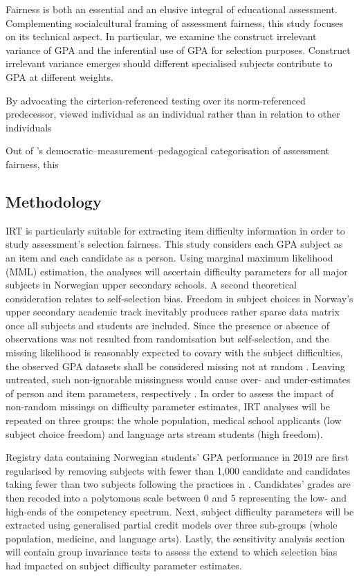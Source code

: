 Fairness is both an essential and an elusive integral of educational assessment. Complementing  socialcultural framing of assessment fairness, this study focuses on its technical aspect. In particular, we examine the construct irrelevant variance of GPA and the inferential use of GPA for selection purposes. Construct irrelevant variance \parencite{messick:1989} emerges should different specialised subjects contribute to GPA at different weights.

By advocating the cirterion-referenced testing over its norm-referenced predecessor, \textcite{glaser:1963} viewed individual as an individual rather than in relation to other individuals

Out of 's democratic--measurement--pedagogical categorisation of assessment fairness, this

\subsection{Methodology}

IRT is particularly suitable for extracting item difficulty information in order to study assessment's selection fairness. This study considers each GPA subject as an item and each candidate as a person. Using marginal maximum likelihood (MML) estimation, the analyses will ascertain difficulty parameters for all major subjects in Norwegian upper secondary schools. A second theoretical consideration relates to self-selection bias. Freedom in subject choices in Norway's upper secondary academic track inevitably produces rather sparse data matrix once all subjects and students are included. Since the presence or absence of observations was not resulted from randomisation but self-selection, and the missing likelihood is reasonably expected to covary with the subject difficulties, the observed GPA datasets shall be considered missing not at random \parencite[MNAR,][]{rubin:1976}. Leaving untreated, such non-ignorable missingness would cause over- and under-estimates of person and item parameters, respectively \parencite{rose:2013}. In order to assess the impact of non-random missings on difficulty parameter estimates, IRT analyses will be repeated on three groups: the whole population, medical school applicants (low subject choice freedom) and language arts stream students (high freedom).

Registry data containing Norwegian students' GPA performance in 2019 are first regularised by removing subjects with fewer than 1,000 candidate and candidates taking fewer than two subjects following the practices in \textcite{he:2018}. Candidates' grades are then recoded into a polytomous scale between $0$ and $5$ representing the low- and high-ends of the competency spectrum. Next, subject difficulty parameters will be extracted using generalised partial credit models \parencite[GPCM,][]{muraki:1992} over three sub-groups (whole population, medicine, and language arts). Lastly, the sensitivity analysis section will contain group invariance tests to assess the extend to which selection bias had impacted on subject difficulty parameter estimates.

